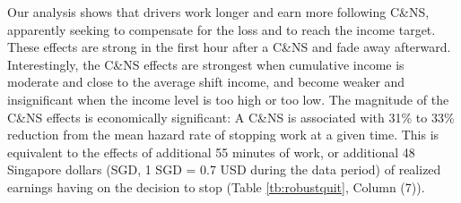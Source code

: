 \documentclass[reviewmode]{restat}
\begin{document}
Our analysis shows that drivers work longer and earn more following 
C\&NS, apparently seeking to compensate for the loss and to reach the income target. 
These effects are strong in the first hour after a 
C\&NS and fade away afterward. Interestingly, the C\&NS effects are strongest when cumulative income 
is moderate and close to the average shift income, and become weaker and insignificant when the income 
level is too high or too low. 
% 
The magnitude of the C\&NS effects is economically significant: A C\&NS
is associated with 31\% to 33\% reduction from the mean hazard rate of stopping work at a given time. 
This is equivalent to the effects of additional 55 minutes of work, or additional 48 Singapore dollars 
(SGD, 1 SGD = 0.7 USD during the data period) of realized earnings having on the decision to stop 
(Table \ref{tb:robustquit}, Column (7)). 

\end{document}
